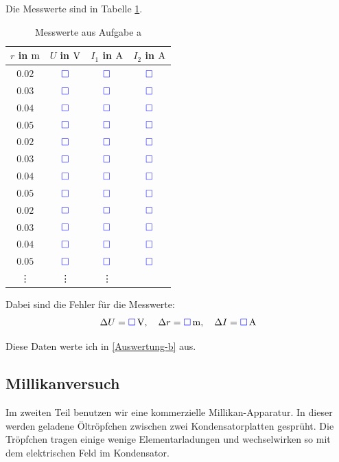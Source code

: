\documentclass[11pt, ngerman]{article}
\newcommand{\messwert}{\textcolor{blue}{\square}}
\begin{document}
Die Messwerte sind in Tabelle \ref{table:Aufgabe-a}.

\begin{table}[H]
	\centering

	\begin{tabular}{cccc}
		$r$ in $\unit m$ & $U$ in $\unit V$ & $I_1$ in $\unit A$ & $I_2$ in $\unit A$ \\
		\hline
		$0.02$ & $\messwert$ & $\messwert$ & $\messwert$ \\
		$0.03$ & $\messwert$ & $\messwert$ & $\messwert$ \\
		$0.04$ & $\messwert$ & $\messwert$ & $\messwert$ \\
		$0.05$ & $\messwert$ & $\messwert$ & $\messwert$ \\
		\hline
		$0.02$ & $\messwert$ & $\messwert$ & $\messwert$ \\
		$0.03$ & $\messwert$ & $\messwert$ & $\messwert$ \\
		$0.04$ & $\messwert$ & $\messwert$ & $\messwert$ \\
		$0.05$ & $\messwert$ & $\messwert$ & $\messwert$ \\
		\hline
		$0.02$ & $\messwert$ & $\messwert$ & $\messwert$ \\
		$0.03$ & $\messwert$ & $\messwert$ & $\messwert$ \\
		$0.04$ & $\messwert$ & $\messwert$ & $\messwert$ \\
		$0.05$ & $\messwert$ & $\messwert$ & $\messwert$ \\
		\hline
		   \vdots & \vdots & \vdots
	\end{tabular}

	\caption{Messwerte aus Aufgabe a}
	\label{table:Aufgabe-a}
\end{table}

Dabei sind die Fehler für die Messwerte:
\[
	\Delta U = \unit[\messwert] V,
	\quad
	\Delta r = \unit[\messwert] m,
	\quad
	\Delta I = \unit[\messwert] A
\]

Diese Daten werte ich in \ref{Auswertung-b} aus.

\subsection{Millikanversuch}

Im zweiten Teil benutzen wir eine kommerzielle Millikan-Apparatur. In dieser
werden geladene Öltröpfchen zwischen zwei Kondensatorplatten gesprüht. Die
Tröpfchen tragen einige wenige Elementarladungen und wechselwirken so mit dem
elektrischen Feld im Kondensator.
\end{document}
